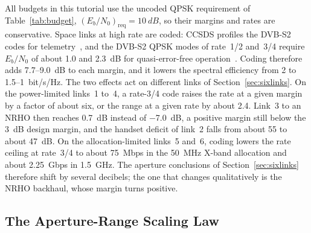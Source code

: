 \documentclass{IEEEoj}
\begin{document}
All budgets in this tutorial use the uncoded QPSK requirement of Table~\ref{tab:budget}, $(E_b/N_0)_{\mathrm{req}} = \SI{10}{dB}$, so their margins and rates are conservative. Space links at high rate are coded: CCSDS profiles the DVB-S2 codes for telemetry~\cite{ccsds_131_3,etsi_dvbs2}, and the DVB-S2 QPSK modes of rate~1/2 and~3/4 require $E_b/N_0$ of about \SI{1.0}{} and \SI{2.3}{dB} for quasi-error-free operation~\cite{etsi_dvbs2}. Coding therefore adds \SI{7.7}{}--\SI{9.0}{dB} to each margin, and it lowers the spectral efficiency from \SI{2}{} to \SI{1.5}{}--\SI{1}{bit/s/Hz}. The two effects act on different links of Section~\ref{sec:sixlinks}. On the power-limited links~1 to~4, a rate-3/4 code raises the rate at a given margin by a factor of about six, or the range at a given rate by about 2.4. Link~3 to an NRHO then reaches \SI{+0.7}{dB} instead of \SI{-7.0}{dB}, a positive margin still below the \SI{3}{dB} design margin, and the handset deficit of link~2 falls from about \SI{55}{} to about \SI{47}{dB}. On the allocation-limited links~5 and~6, coding lowers the rate ceiling at rate~3/4 to about \SI{75}{Mbps} in the \SI{50}{MHz} X-band allocation and about \SI{2.25}{Gbps} in \SI{1.5}{GHz}. The aperture conclusions of Section~\ref{sec:sixlinks} therefore shift by several decibels; the one that changes qualitatively is the NRHO backhaul, whose margin turns positive.



\subsection{The Aperture-Range Scaling Law}
\end{document}
